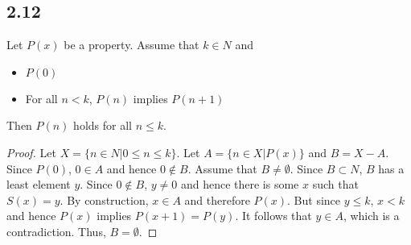 \subsection*{2.12}

Let $P(x)$ be a property. Assume that $k \in N$ and

\begin{itemize}
    \item $P(0)$
    \item For all $n < k$, $P(n)$ implies $P(n+1)$
\end{itemize}

Then $P(n)$ holds for all $n \leq k$.

\begin{proof}
Let $X = \{n\in N| 0 \leq n \leq k\}$. Let $A = \{n \in X|P(x)\}$ and $B = X - A$. Since $P(0)$, $0 \in A$ and hence $0 \notin B$. Assume that $B \neq \emptyset$. Since $B \subset N$, $B$ has a least element $y$. Since $0 \notin B$, $y \neq 0$ and hence there is some $x$ such that $S(x) = y$. By construction, $x \in A$ and therefore $P(x)$. But since $y \leq k$, $x < k$ and hence $P(x)$ implies $P(x+1) = P(y)$. It follows that $y \in A$, which is a contradiction. Thus, $B = \emptyset$.
\end{proof}

